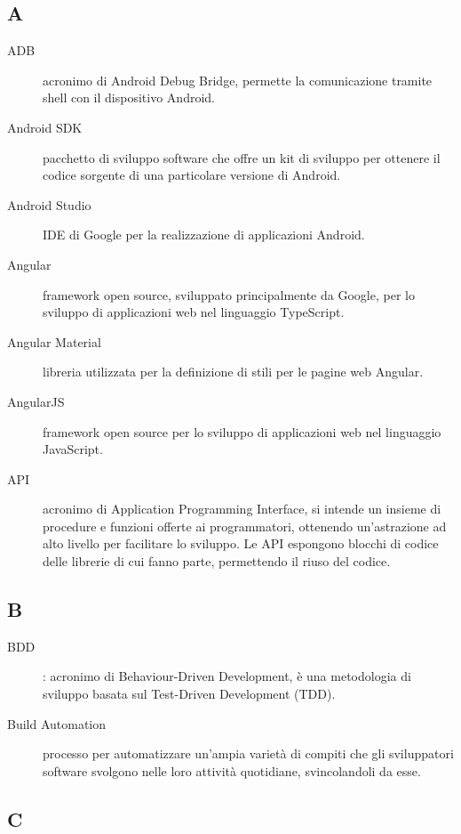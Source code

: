 \documentclass[../../../manuale.sviluppatore.tex]{subfiles}
\begin{document}
\subsection{A}

\begin{description}
    \item[ADB] acronimo di Android Debug Bridge, permette la comunicazione tramite shell con il dispositivo Android.
    \item[Android SDK] pacchetto di sviluppo software che offre un kit di sviluppo per ottenere il codice sorgente di una particolare versione di Android.
    \item[Android Studio] IDE di Google per la realizzazione di applicazioni Android.
    \item[Angular] framework open source, sviluppato principalmente da Google, per lo sviluppo di applicazioni web nel linguaggio TypeScript.
    \item[Angular Material] libreria utilizzata per la definizione di stili per le pagine web Angular.
    \item[AngularJS] framework open source per lo sviluppo di applicazioni web nel linguaggio JavaScript.
    \item[API] acronimo di Application Programming Interface, si intende un insieme di procedure e funzioni offerte ai programmatori, ottenendo un'astrazione ad alto livello per facilitare lo sviluppo. Le API espongono blocchi di codice delle librerie di cui fanno parte, permettendo il riuso del codice.
\end{description}

\subsection{B}
\begin{description}
    \item[BDD]: acronimo di Behaviour-Driven Development, è una metodologia di sviluppo basata sul Test-Driven Development (TDD).
    \item[Build Automation] processo per automatizzare un'ampia varietà di compiti che gli sviluppatori software svolgono nelle loro attività quotidiane, svincolandoli da esse.
\end{description}

\subsection{C}
\end{document}
